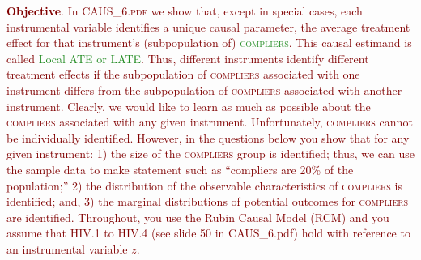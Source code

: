 \documentclass{article}
\begin{document}
\noindent \textcolor{Maroon}{\textbf{Objective}. In \textsc{CAUS\_6.pdf} we show that, except in special cases, each instrumental variable identifies a unique causal parameter, the average treatment effect for that instrument's (subpopulation of) \textcolor{ForestGreen}{\textsc{compliers}}. This causal estimand is called \textcolor{ForestGreen}{Local ATE or LATE}. Thus, different instruments identify different treatment effects if the subpopulation of \textsc{compliers} associated with one instrument differs from the subpopulation of \textsc{compliers} associated with another instrument. Clearly, we would like to learn as much as possible about the \textsc{compliers} associated with any given instrument. Unfortunately, \textsc{compliers} cannot be individually identified. However, in the questions below you show that for any given instrument: 1) the size of the \textsc{compliers} group is identified; thus, we can use the sample data to make statement such as ``compliers are 20\% of the population;'' 2) the distribution of the observable characteristics of \textsc{compliers} is identified; and, 3) the marginal distributions of potential outcomes for \textsc{compliers} are identified. Throughout, you use the Rubin Causal Model (RCM) and you assume that HIV.1 to HIV.4 (see slide 50 in CAUS\_6.pdf) hold with reference to an instrumental variable $z$.}
\end{document}
